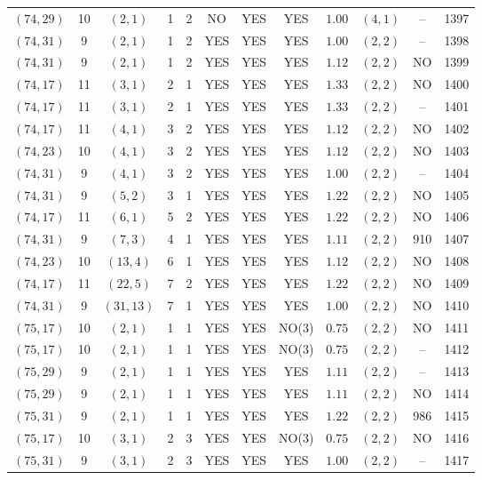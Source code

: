 \begin{longtable}{|c|c|c|c|c|c|c|c|c|c|c|c|}
$(74,29)$ & 10 & $(2,1)$ & 1 & 2 & NO & YES & YES & $1.00$ & $(4,1)$ & -- & 1397\\
$(74,31)$ & 9 & $(2,1)$ & 1 & 2 & YES & YES & YES & $1.00$ & $(2,2)$ & -- & 1398\\
$(74,31)$ & 9 & $(2,1)$ & 1 & 2 & YES & YES & YES & $1.12$ & $(2,2)$ & NO & 1399\\
$(74,17)$ & 11 & $(3,1)$ & 2 & 1 & YES & YES & YES & $1.33$ & $(2,2)$ & NO & 1400\\
$(74,17)$ & 11 & $(3,1)$ & 2 & 1 & YES & YES & YES & $1.33$ & $(2,2)$ & -- & 1401\\
$(74,17)$ & 11 & $(4,1)$ & 3 & 2 & YES & YES & YES & $1.12$ & $(2,2)$ & NO & 1402\\
$(74,23)$ & 10 & $(4,1)$ & 3 & 2 & YES & YES & YES & $1.12$ & $(2,2)$ & NO & 1403\\
$(74,31)$ & 9 & $(4,1)$ & 3 & 2 & YES & YES & YES & $1.00$ & $(2,2)$ & -- & 1404\\
$(74,31)$ & 9 & $(5,2)$ & 3 & 1 & YES & YES & YES & $1.22$ & $(2,2)$ & NO & 1405\\
$(74,17)$ & 11 & $(6,1)$ & 5 & 2 & YES & YES & YES & $1.22$ & $(2,2)$ & NO & 1406\\
$(74,31)$ & 9 & $(7,3)$ & 4 & 1 & YES & YES & YES & $1.11$ & $(2,2)$ & 910 & 1407\\
$(74,23)$ & 10 & $(13,4)$ & 6 & 1 & YES & YES & YES & $1.12$ & $(2,2)$ & NO & 1408\\
$(74,17)$ & 11 & $(22,5)$ & 7 & 2 & YES & YES & YES & $1.22$ & $(2,2)$ & NO & 1409\\
$(74,31)$ & 9 & $(31,13)$ & 7 & 1 & YES & YES & YES & $1.00$ & $(2,2)$ & NO & 1410\\
$(75,17)$ & 10 & $(2,1)$ & 1 & 1 & YES & YES & NO(3) & $0.75$ & $(2,2)$ & NO & 1411\\
$(75,17)$ & 10 & $(2,1)$ & 1 & 1 & YES & YES & NO(3) & $0.75$ & $(2,2)$ & -- & 1412\\
$(75,29)$ & 9 & $(2,1)$ & 1 & 1 & YES & YES & YES & $1.11$ & $(2,2)$ & -- & 1413\\
$(75,29)$ & 9 & $(2,1)$ & 1 & 1 & YES & YES & YES & $1.11$ & $(2,2)$ & NO & 1414\\
$(75,31)$ & 9 & $(2,1)$ & 1 & 1 & YES & YES & YES & $1.22$ & $(2,2)$ & 986 & 1415\\
$(75,17)$ & 10 & $(3,1)$ & 2 & 3 & YES & YES & NO(3) & $0.75$ & $(2,2)$ & NO & 1416\\
$(75,31)$ & 9 & $(3,1)$ & 2 & 3 & YES & YES & YES & $1.00$ & $(2,2)$ & -- & 1417\\

\end{longtable}
